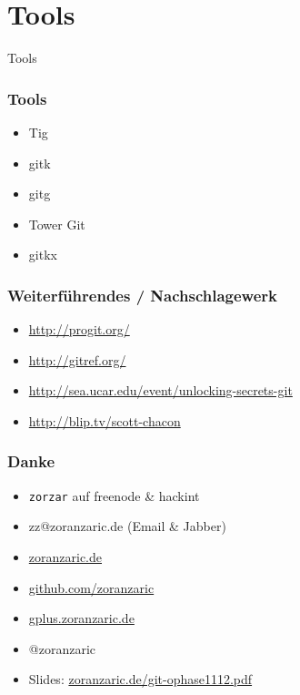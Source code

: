 \documentclass[]{beamer}
\begin{document}
\section{Tools}
\begin{frame}
	\fontsize{30}{10}\selectfont Tools
\end{frame}

\begin{frame}
	\frametitle{Tools}
	\begin{itemize}
		\item
			Tig
		\item
			gitk
		\item
			gitg
		\item
			Tower Git
		\item
			gitkx
	\end{itemize}
\end{frame}

\begin{frame}
	\frametitle{Weiterführendes / Nachschlagewerk}
	\begin{itemize}
		\item
			\url{http://progit.org/}
		\item
			\url{http://gitref.org/}
		\item
			\url{http://sea.ucar.edu/event/unlocking-secrets-git}
		\item
			\url{http://blip.tv/scott-chacon}
	\end{itemize}
\end{frame}

\begin{frame}[fragile]
	\frametitle{Danke}
	\begin{itemize}
		\item
			\verb|zorzar| auf freenode \& hackint
		\item
			zz@zoranzaric.de (Email \& Jabber)
		\item
			\url{zoranzaric.de}
		\item
			\url{github.com/zoranzaric}
		\item
			\url{gplus.zoranzaric.de}
		\item
			@zoranzaric\\[0.5cm]
		\item
			Slides: \url{zoranzaric.de/git-ophase1112.pdf}
	\end{itemize}
\end{frame}
\end{document}
